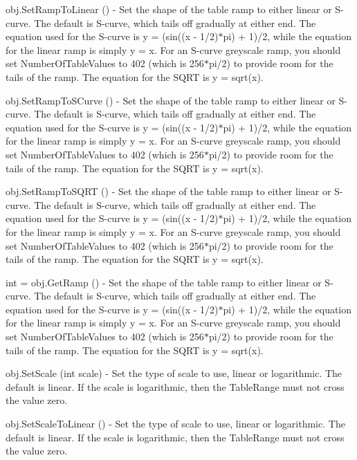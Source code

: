 \begin{DoxyItemize}
\item {\ttfamily obj.\-Set\-Ramp\-To\-Linear ()} -\/ Set the shape of the table ramp to either linear or S-\/curve. The default is S-\/curve, which tails off gradually at either end. The equation used for the S-\/curve is y = (sin((x -\/ 1/2)$\ast$pi) + 1)/2, while the equation for the linear ramp is simply y = x. For an S-\/curve greyscale ramp, you should set Number\-Of\-Table\-Values to 402 (which is 256$\ast$pi/2) to provide room for the tails of the ramp. The equation for the S\-Q\-R\-T is y = sqrt(x).  
\item {\ttfamily obj.\-Set\-Ramp\-To\-S\-Curve ()} -\/ Set the shape of the table ramp to either linear or S-\/curve. The default is S-\/curve, which tails off gradually at either end. The equation used for the S-\/curve is y = (sin((x -\/ 1/2)$\ast$pi) + 1)/2, while the equation for the linear ramp is simply y = x. For an S-\/curve greyscale ramp, you should set Number\-Of\-Table\-Values to 402 (which is 256$\ast$pi/2) to provide room for the tails of the ramp. The equation for the S\-Q\-R\-T is y = sqrt(x).  
\item {\ttfamily obj.\-Set\-Ramp\-To\-S\-Q\-R\-T ()} -\/ Set the shape of the table ramp to either linear or S-\/curve. The default is S-\/curve, which tails off gradually at either end. The equation used for the S-\/curve is y = (sin((x -\/ 1/2)$\ast$pi) + 1)/2, while the equation for the linear ramp is simply y = x. For an S-\/curve greyscale ramp, you should set Number\-Of\-Table\-Values to 402 (which is 256$\ast$pi/2) to provide room for the tails of the ramp. The equation for the S\-Q\-R\-T is y = sqrt(x).  
\item {\ttfamily int = obj.\-Get\-Ramp ()} -\/ Set the shape of the table ramp to either linear or S-\/curve. The default is S-\/curve, which tails off gradually at either end. The equation used for the S-\/curve is y = (sin((x -\/ 1/2)$\ast$pi) + 1)/2, while the equation for the linear ramp is simply y = x. For an S-\/curve greyscale ramp, you should set Number\-Of\-Table\-Values to 402 (which is 256$\ast$pi/2) to provide room for the tails of the ramp. The equation for the S\-Q\-R\-T is y = sqrt(x).  
\item {\ttfamily obj.\-Set\-Scale (int scale)} -\/ Set the type of scale to use, linear or logarithmic. The default is linear. If the scale is logarithmic, then the Table\-Range must not cross the value zero.  
\item {\ttfamily obj.\-Set\-Scale\-To\-Linear ()} -\/ Set the type of scale to use, linear or logarithmic. The default is linear. If the scale is logarithmic, then the Table\-Range must not cross the value zero.  

\end{DoxyItemize}
